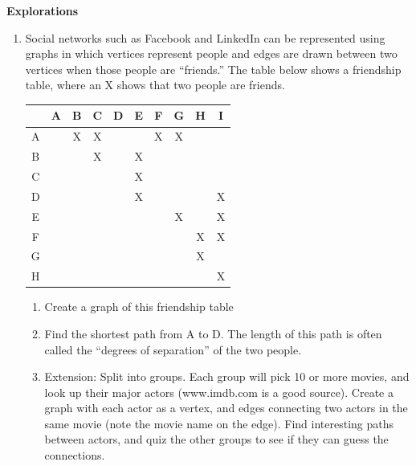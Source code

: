 \noindent \textbf{Explorations}

\begin{enumerate}[start=18]
\item Social networks such as Facebook and LinkedIn can be represented using graphs in which vertices represent people and edges are drawn between two vertices when those people are ``friends.''   The table below shows a friendship table, where an X shows that two people are friends.
\begin{center}
\begin{tabular}{|c|c|c|c|c|c|c|c|c|c|}
\hline
&A&B&C&D&E&F&G&H&I\\
\hline
A & \cellcolor{yellow}&X&X&&&X&X&&\\
\hline
B& \cellcolor{yellow}& \cellcolor{yellow}&X&&X&&&&\\
\hline
C& \cellcolor{yellow}& \cellcolor{yellow}& \cellcolor{yellow}&&X&&&&\\
\hline
D& \cellcolor{yellow}& \cellcolor{yellow}& \cellcolor{yellow}& \cellcolor{yellow}&X&&&&X\\
\hline
E& \cellcolor{yellow}& \cellcolor{yellow}& \cellcolor{yellow}& \cellcolor{yellow}& \cellcolor{yellow}&&X&&X\\
\hline
F& \cellcolor{yellow}& \cellcolor{yellow}& \cellcolor{yellow}& \cellcolor{yellow}& \cellcolor{yellow}& \cellcolor{yellow}&&X&X\\
\hline
G& \cellcolor{yellow}& \cellcolor{yellow}& \cellcolor{yellow}& \cellcolor{yellow}& \cellcolor{yellow}& \cellcolor{yellow}& \cellcolor{yellow}&X&\\
\hline
H& \cellcolor{yellow}& \cellcolor{yellow}& \cellcolor{yellow}& \cellcolor{yellow}& \cellcolor{yellow}& \cellcolor{yellow}& \cellcolor{yellow}& \cellcolor{yellow}&X\\
\hline
\end{tabular}
\par{}\label{tab:graphtheory-dor1-tab04}%

\end{center}
\begin{enumerate}
\item	Create a graph of this friendship table
\item	Find the shortest path from A to D.  The length of this path is often called the ``degrees of separation'' of the two people.
\item	Extension:  Split into groups.  Each group will pick 10 or more movies, and look up their major actors (www.imdb.com is a good source).  Create a graph with each actor as a vertex, and edges connecting two actors in the same movie (note the movie name on the edge).  Find interesting paths between actors, and quiz the other groups to see if they can guess the connections.\\
\end{enumerate}


\end{enumerate}
